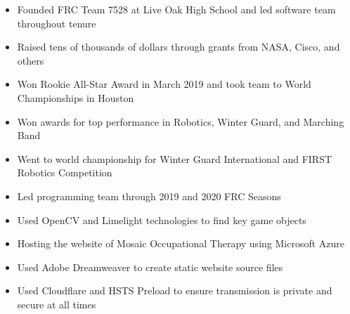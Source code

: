 \documentclass[10pt,a4paper,ragged2e,withhyper]{altacv}
\begin{document}
\begin{paracol}{2}
            \begin{itemize}
                \item Founded FRC Team 7528 at Live Oak High School and led software team throughout tenure
                \item Raised tens of thousands of dollars through grants from NASA, Cisco, and others
                \item Won Rookie All-Star Award in March 2019 and took team to World Championships in Houston
            \end{itemize}


            \divider

            \begin{itemize}
                \item Won awards for top performance in Robotics, Winter Guard, and Marching Band
                \item Went to world championship for Winter Guard International and FIRST Robotics Competition
            \end{itemize}

            \begin{itemize}
                \item Led programming team through 2019 and 2020 FRC Seasons
                \item Used OpenCV and Limelight technologies to find key game objects
            \end{itemize}
            \divider

                    \begin{itemize}
                \item Hosting the website of Mosaic Occupational Therapy using Microsoft Azure
                \item Used Adobe Dreamweaver to create static website source files
                \item Used Cloudflare and HSTS Preload to ensure transmission is private and secure at all times
            \end{itemize}
    \end{paracol}
\end{document}
